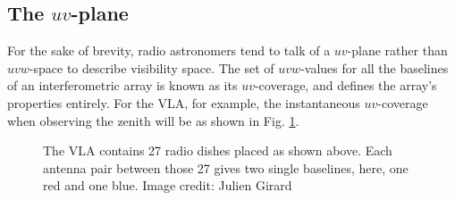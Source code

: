 \subsection{The $uv$-plane}

\pg
For the sake of brevity, radio astronomers tend to talk of a $uv$-plane rather than $uvw$-space to describe visibility space. The set of $uvw$-values for all the baselines of an interferometric array is known as its $uv$-coverage, and defines the array's properties entirely.
For the VLA, for example, the instantaneous $uv$-coverage when observing the zenith will be as shown in Fig. \ref{fig.vla.uvcoverage}.

\begin{figure}[ht]
\centering
{}
\caption{\label{fig.vla.uvcoverage} The VLA contains 27 radio dishes placed as shown above. Each antenna pair between those 27 gives two single baselines, here, one red and one blue. Image credit: Julien Girard}
\end{figure}


